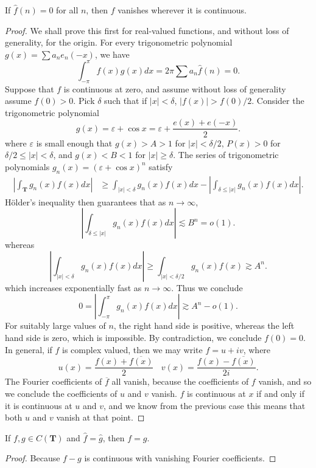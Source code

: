 \begin{theorem}
    If $\widehat{f}(n) = 0$ for all $n$, then $f$ vanishes wherever it is continuous.
\end{theorem}
\begin{proof}
    We shall prove this first for real-valued functions, and without loss of generality, for the origin. For every trigonometric polynomial $g(x) = \sum a_n e_n(-x)$, we have
    \[ \int_{-\pi}^\pi f(x) g(x) dx = 2 \pi \sum a_n \widehat{f}(n) = 0. \]
    Suppose that $f$ is continuous at zero, and assume without loss of generality assume $f(0) > 0$. Pick $\delta$ such that if $|x| < \delta$, $|f(x)| > f(0)/2$. Consider the trigonometric polynomial
    \[ g(x) = \varepsilon + \cos x = \varepsilon + \frac{e(x) + e(-x)}{2}. \]
    where $\varepsilon$ is small enough that $g(x) > A > 1$ for $|x| < \delta/2$, $P(x) > 0$ for $\delta/2 \leq |x| < \delta$, and $g(x) < B < 1$ for $|x| \geq \delta$. The series of trigonometric polynomials $g_n(x) = (\varepsilon + \cos x)^n$ satisfy
    \begin{align*}
        \left| \int_{\mathbf{T}} g_n(x) f(x) dx \right| &\geq \int_{|x| < \delta} g_n(x) f(x) dx - \left| \int_{\delta \leq |x|} g_n(x) f(x) dx \right|.
    \end{align*}
    H\"{o}lder's inequality then guarantees that as $n \to \infty$,
    \[ \left| \int_{\delta \leq |x|} g_n(x) f(x) dx \right| \lesssim B^n = o(1). \]
    whereas
    \[ \left| \int_{|x| < \delta} g_n(x) f(x) dx \right| \geq \int_{|x| < \delta/2} g_n(x) f(x) \gtrsim A^n. \]
    which increases exponentially fast as $n \to \infty$. Thus we conclude
    \[ 0 = \left| \int_{-\pi}^\pi g_n(x) f(x) dx \right| \gtrsim A^n - o(1). \]
    For suitably large values of $n$, the right hand side is positive, whereas the left hand side is zero, which is impossible. By contradiction, we conclude $f(0) = 0$. In general, if $f$ is complex valued, then we may write $f = u + iv$, where
    \[ u(x) = \frac{f(x) + \overline{f(x)}}{2}\ \ \ \ v(x) = \frac{f(x) - \overline{f(x)}}{2i}. \]
    The Fourier coefficients of $\overline{f}$ all vanish, because the coefficients of $f$ vanish, and so we conclude the coefficients of $u$ and $v$ vanish. $f$ is continuous at $x$ if and only if it is continuous at $u$ and $v$, and we know from the previous case this means that both $u$ and $v$ vanish at that point.
\end{proof}

\begin{corollary}
	If $f,g \in C(\mathbf{T})$ and $\widehat{f} = \widehat{g}$, then $f = g$.
\end{corollary}
\begin{proof}
    Because $f - g$ is continuous with vanishing Fourier coefficients.
\end{proof}

